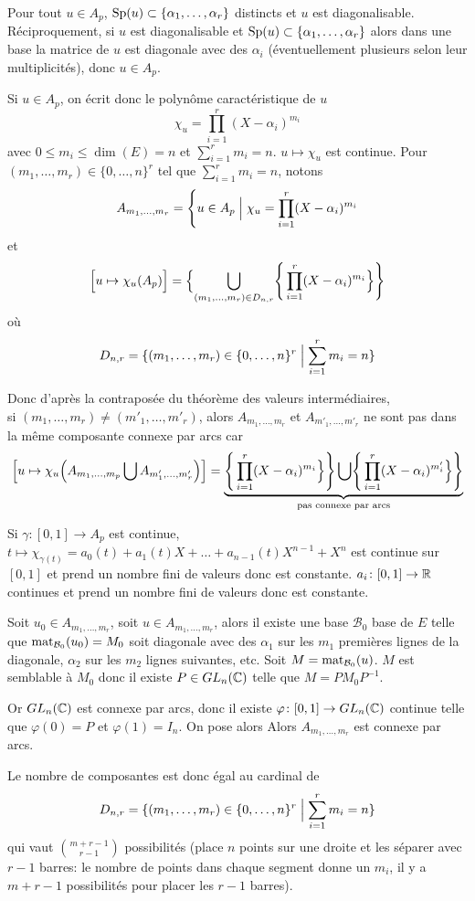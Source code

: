 \begin{solution}
	Pour tout $u\in A_{p}$, $\operatorname{Sp}(u)\subset\{\alpha_{1},\dots,\alpha_{r}\}$ distincts et $u$ est diagonalisable. Réciproquement, si $u$ est diagonalisable et $\operatorname{Sp}(u)\subset\{\alpha_{1},\dots,\alpha_{r}\}$ alors dans une base la matrice de $u$ est diagonale avec des $\alpha_{i}$ (éventuellement plusieurs selon leur multiplicités), donc $u\in A_{p}$.

	Si $u\in A_{p}$, on écrit donc le polynôme caractéristique de $u$
	$$\chi_{u}=\prod_{i=1}^{r}(X-\alpha_{i})^{m_{i}}$$
	avec $0\leqslant m_{i}\leqslant\dim(E)=n$ et $\sum_{i=1}^{r}m_{i}=n$.
	$u\mapsto\chi_{u}$ est continue. Pour $(m_{1},\dots,m_{r})\in\{0,\dots,n\}^{r}$ tel que $\sum_{i=1}^{r}m_{i}=n$, notons 
	$$A_{m_{1},\dots,m_{r}}=\Biggl\{u\in A_{p}\Bigm|\chi_{u}=\prod_{i=1}^{r}(X-\alpha_{i})^{m_{i}}$$
	et 
	$$\Bigl[u\mapsto\chi_u(A_{p})\Bigr]=\Bigl\{\bigcup_{(m_{1},\dots,m_{r})\in D_{n,r}}\Biggr\{\prod_{i=1}^{r}(X-\alpha_{i})^{m_{i}}\Bigr\}\Biggr\}$$
	où
	$$D_{n,r}=\{(m_{1},\dots,m_{r})\in\{0,\dots,n\}^{r}\Bigm|\sum_{i=1}^{r}m_{i}=n\}$$

	Donc d'après la contraposée du théorème des valeurs intermédiaires,\\si $(m_{1},\dots,m_{r})\neq(m'_{1},\dots,m'_{r})$, alors $A_{m_{1},\dots,m_{r}}$ et $A_{m'_{1},\dots,m'_{r}}$ ne sont pas dans la même composante connexe par arcs car
	$$\Bigl[u\mapsto\chi_u\Bigl(A_{m_{1},\dots,m_{p}}\bigcup A_{m'_{1},\dots,m'_{r}}\Bigr)\Bigr]=\underbrace{\Biggr\{\prod_{i=1}^{r}(X-\alpha_{i})^{m_{i}}\Bigr\}\Biggr\}\bigcup\Biggr\{\prod_{i=1}^{r}(X-\alpha_{i})^{m'_{i}}\Bigr\}\Biggr\}}_{\text{pas connexe par arcs}}$$
	
	Si $\gamma\colon[0,1]\to A_{p}$ est continue, $t\mapsto\chi_{\gamma(t)}=a_{0}(t)+a_{1}(t)X+\dots+a_{n-1}(t)X^{n-1}+X^{n}$ est continue sur $[0,1]$ et prend un nombre fini de valeurs donc est constante. $a_{i}\colon[0,1]\to\mathbb{R}$ continues et prend un nombre fini de valeurs donc est constante.

	Soit $u_{0}\in A_{m_{1},\dots,m_{r}}$, soit $u\in A_{m_{1},\dots,m_{r}}$, alors il existe une base $\mathcal{B}_{0}$ base de $E$ telle que $\operatorname{mat}\limits_{\mathcal{B}_{0}}(u_{0})=M_{0}$ soit diagonale avec des $\alpha_{1}$ sur les $m_{1}$ premières lignes de la diagonale, $\alpha_{2}$ sur les $m_{2}$ lignes suivantes, etc. Soit $M=\operatorname{mat}\limits_{\mathcal{B}_{0}}(u)$. $M$ est semblable à $M_{0}$ donc il existe $P\in GL_{n}(\mathbb{C})$ telle que $M=PM_{0}P^{-1}$.

	Or $GL_{n}(\mathbb{C})$ est connexe par arcs, donc il existe $\varphi\colon[0,1]\to GL_{n}(\mathbb{C})$ continue telle que $\varphi(0)=P$ et $\varphi(1)=I_{n}$. On pose alors 
	Alors $A_{m_{1},\dots,m_{r}}$ est connexe par arcs.

	Le nombre de composantes est donc égal au cardinal de 
	$$D_{n,r}=\{(m_{1},\dots,m_{r})\in\{0,\dots,n\}^{r}\Bigm|\sum_{i=1}^{r}m_{i}=n\}$$
	qui vaut $\binom{m+r-1}{r-1}$ possibilités (place $n$ points sur une droite et les séparer avec $r-1$ barres: le nombre de points dans chaque segment donne un $m_{i}$, il y a $m+r-1$ possibilités pour placer les $r-1$ barres).
\end{solution}

